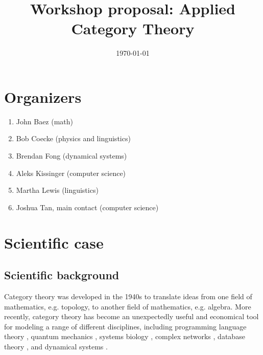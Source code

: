 \documentclass{article}
\title{Workshop proposal: Applied Category Theory}
\date{\today}
\begin{document}
\maketitle

\section{Organizers}
\begin{enumerate}
\item John Baez (math)
\item Bob Coecke (physics and linguistics) 
\item Brendan Fong (dynamical systems)
\item Aleks Kissinger (computer science)
\item Martha Lewis (linguistics)
\item Joshua Tan, main contact (computer science)
\end{enumerate}

\section{Scientific case}
\subsection{Scientific background}
Category theory was developed in the 1940s to translate ideas from one field of mathematics, e.g. topology, to another field of mathematics, e.g. algebra. More recently, category theory has become an unexpectedly useful and economical tool for modeling a range of different disciplines, including programming language theory \cite{moggi91}, quantum mechanics \cite{abramsky09}, systems biology \cite{rosen58}, complex networks \cite{baez15}, database theory \cite{rosebrugh03}, and dynamical systems \cite{spivak16}.
\end{document}
